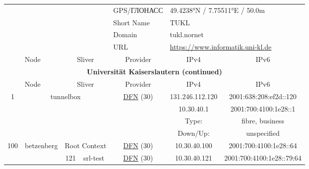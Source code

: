 \begin{small}
\begin{center}
\begin{longtable}{|c|c|c|c|c|c|c|c|}
 \multicolumn{4}{|c|}{} & \multicolumn{1}{|l|}{GPS/ГЛОНАСС} & \multicolumn{3}{|l|}{49.4238°N / 7.75511°E / 50.0m} \\* \cline{5-5}\cline{6-6}\cline{7-7}\cline{8-8}
 \multicolumn{4}{|c|}{} & \multicolumn{1}{|l|}{Short Name} & \multicolumn{3}{|l|}{\nomenclature{TUKL}{Universität Kaiserslautern}\index{TUKL|see{Universität Kaiserslautern}}TUKL} \\* \cline{5-5}\cline{6-6}\cline{7-7}\cline{8-8}
 \multicolumn{4}{|c|}{} & \multicolumn{1}{|l|}{Domain} & \multicolumn{3}{|l|}{\index{tukl.nornet}tukl.nornet} \\* \cline{5-5}\cline{6-6}\cline{7-7}\cline{8-8}
 \multicolumn{4}{|c|}{} & \multicolumn{1}{|l|}{URL} & \multicolumn{3}{|l|}{\url{https://www.informatik.uni-kl.de}} \\ \hline
 \multicolumn{2}{|p{8em}|}{Node} & \multicolumn{2}{|p{8em}|}{Sliver} & \multicolumn{2}{|p{8em}|}{Provider} & IPv4 & IPv6 \\ \hline
\endfirsthead
\hline
 \multicolumn{8}{|c|}{\textbf{Universität Kaiserslautern (continued)}} \\ \hline
 \multicolumn{2}{|p{8em}|}{Node} & \multicolumn{2}{|p{8em}|}{Sliver} & \multicolumn{2}{|p{8em}|}{Provider} & IPv4 & IPv6 \\ \hline
\endhead
 \multirow{4}{*}{\tiny{1}} & \multicolumn{3}{|c|}{\multirow{4}{*}{\tiny{tunnelbox}}} & \multicolumn{2}{|c|}{\multirow{4}{*}{\tiny{\href{https://www.dfn.de}{DFN} (30)}}} & \tiny{131.246.112.120} & \tiny{2001:638:208:ef2d::120} \\* \cline{7-7}\cline{8-8}
  & \multicolumn{3}{|c|}{} & \multicolumn{2}{|c|}{} & \tiny{10.30.40.1} & \tiny{2001:700:4100:1e28::1} \\* \cline{7-7}\cline{8-8}
  & \multicolumn{3}{|c|}{} & \multicolumn{2}{|c|}{} & Type: & fibre, business \\* \cline{7-7}\cline{8-8}
  & \multicolumn{3}{|c|}{} & \multicolumn{2}{|c|}{} & Down/Up:  & unspecified \\ \hline
 \multirow{13}{*}{\tiny{100}} & \multicolumn{1}{|l|}{\multirow{13}{*}{\tiny{betzenberg}}} & \multicolumn{2}{|c|}{\tiny{Root Context}} & \multicolumn{2}{|c|}{\tiny{\href{https://www.dfn.de}{DFN} (30)}} & \tiny{10.30.40.100} & \tiny{2001:700:4100:1e28::64} \\* \cline{3-3}\cline{4-4}\cline{5-5}\cline{6-6}\cline{7-7}\cline{8-8}
  &  & \tiny{121} & \multicolumn{1}{|l|}{\tiny{srl-test}} & \multicolumn{2}{|c|}{\tiny{\href{https://www.dfn.de}{DFN} (30)}} & \tiny{10.30.40.121} & \tiny{2001:700:4100:1e28::79:64} \\* \cline{3-3}\cline{4-4}\cline{5-5}\cline{6-6}\cline{7-7}\cline{8-8}

\end{longtable}
\end{center}
\end{small}
